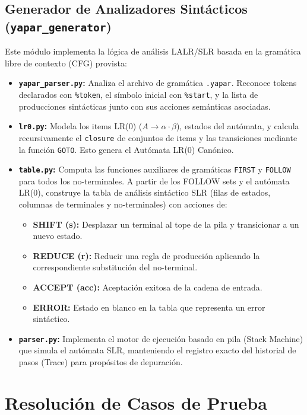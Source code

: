 \documentclass[12pt,letterpaper]{article}
\begin{document}
\subsection{Generador de Analizadores Sintácticos (\texttt{yapar\_generator})}
Este módulo implementa la lógica de análisis LALR/SLR basada en la gramática libre de contexto (CFG) provista:
\begin{itemize}
    \item \textbf{\texttt{yapar\_parser.py}:} Analiza el archivo de gramática \texttt{.yapar}. Reconoce tokens declarados con \texttt{\%token}, el símbolo inicial con \texttt{\%start}, y la lista de producciones sintácticas junto con sus acciones semánticas asociadas.
    \item \textbf{\texttt{lr0.py}:} Modela los items LR(0) ($A \rightarrow \alpha \cdot \beta$), estados del autómata, y calcula recursivamente el \texttt{closure} de conjuntos de items y las transiciones mediante la función \texttt{GOTO}. Esto genera el Autómata LR(0) Canónico.
    \item \textbf{\texttt{table.py}:} Computa las funciones auxiliares de gramáticas \texttt{FIRST} y \texttt{FOLLOW} para todos los no-terminales. A partir de los FOLLOW sets y el autómata LR(0), construye la tabla de análisis sintáctico SLR (filas de estados, columnas de terminales y no-terminales) con acciones de:
    \begin{itemize}
        \item \textbf{SHIFT (s):} Desplazar un terminal al tope de la pila y transicionar a un nuevo estado.
        \item \textbf{REDUCE (r):} Reducir una regla de producción aplicando la correspondiente substitución del no-terminal.
        \item \textbf{ACCEPT (acc):} Aceptación exitosa de la cadena de entrada.
        \item \textbf{ERROR:} Estado en blanco en la tabla que representa un error sintáctico.
    \end{itemize}
    \item \textbf{\texttt{parser.py}:} Implementa el motor de ejecución basado en pila (Stack Machine) que simula el autómata SLR, manteniendo el registro exacto del historial de pasos (Trace) para propósitos de depuración.
\end{itemize}

\section{Resolución de Casos de Prueba}
\end{document}
